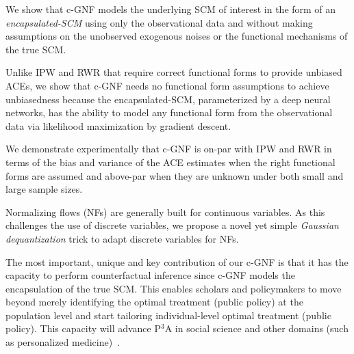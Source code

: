 \documentclass[letterpaper]{article} %
\begin{document}
\begin{inparaenum}[1.]
    \item We show that c-GNF models the underlying SCM of interest in the form of an \emph{encapsulated-SCM} using only the observational data and without making assumptions on the unobserved exogenous noises or the functional mechanisms of the true SCM.
    
    \item Unlike IPW and RWR that require correct functional forms to provide unbiased ACEs, we show that c-GNF needs no functional form assumptions to achieve unbiasedness because the encapsulated-SCM, parameterized by a deep neural networks, has the ability to model any functional form from the observational data via likelihood maximization by gradient descent.
    
    
    \item We demonstrate experimentally that c-GNF is on-par with IPW and RWR in terms of the bias and variance of the ACE estimates when the right functional forms are assumed and above-par when they are unknown under both small and large sample sizes.%
    
    \item Normalizing flows (NFs) are generally built for continuous variables. As this challenges the use of discrete variables, we propose a novel yet simple \emph{Gaussian dequantization} trick to adapt discrete variables for NFs.

    \item The most important, unique and key contribution of our c-GNF is that it has the capacity to perform counterfactual inference since c-GNF models the encapsulation of the true SCM. This enables scholars and policymakers to move beyond merely identifying the optimal treatment (public policy) at the population level and start tailoring individual-level optimal treatment (public policy). This capacity will advance P$^3$A in social science and other domains (such as personalized medicine)~\cite{kino2021adelmlreview}.
    
\end{inparaenum}
\end{document}
